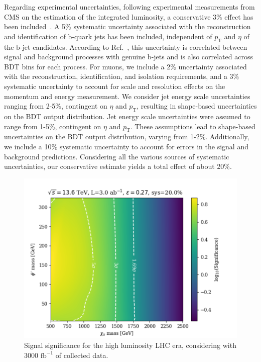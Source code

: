 Regarding experimental uncertainties, following experimental measurements from CMS on the estimation of the integrated luminosity, a conservative 3\% effect has been included~\parencite{lumiRef}. A 5\% systematic uncertainty associated with the reconstruction and identification of $\mathrm{b}$-quark jets has been included, independent of $p_\mathrm{T}$ and $\eta$ of the $\mathrm{b}$-jet candidates. According to Ref.~\parencite{CMSbtag}, this uncertainty is correlated between signal and background processes with genuine  \textrm{b}-jets and is also correlated across BDT bins for each process. For muons, we include a 2\% uncertainty associated with the reconstruction, identification, and isolation requirements, and a 3\% systematic uncertainty to account for scale and resolution effects on the momentum and energy measurement. 
We consider jet energy scale uncertainties ranging from 2-5\%, contingent on $\eta$ and $p_\mathrm{T}$, resulting in shape-based uncertainties on the BDT output distribution. Jet energy scale uncertainties were assumed to range from 1-5\%, contingent on $\eta$ and $p_\mathrm{T}$. These assumptions lead to shape-based uncertainties on the BDT output distribution, varying from 1-2\%. Additionally, we include  a 10\% systematic uncertainty to account for errors in the signal and background predictions. Considering all the various sources of systematic uncertainties, our conservative  estimate yields a total effect of about 20\%. 

\begin{figure}[]
\centering
  \centering
  \includegraphics[width=.95\linewidth]{Images/significance.pdf}
  \caption{Signal significance for the high luminosity LHC era, considering with 3000  $\mathrm{fb}^{-1}$ of collected data.}
  \label{fig:/significance_3000}
\end{figure}

